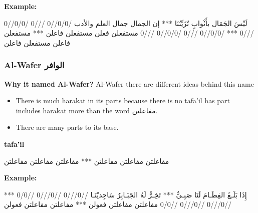 \textbf{Example:}

\begin{Arabic}
	\begin{traditionalpoem*}
          
لَيْسَ الجَمَال بأَثْوابٍ تُزَيِّنُنَا    ***	إن الجمال جمال العلم والأدب
/0/0//0 ///0 /0/0//0 ///0   ***  /0/0//0 ///0 /0/0//0 ///0
مستفعلن فعلن مستفعلن فاعلن  *** مستفعلن فاعلن مستفعلن فاعلن
	\end{traditionalpoem*}
      \end{Arabic}

\subsubsection{Al-Wafer \textarabic{الوافر}}
\textbf{Why it named Al-Wafer?}
Al-Wafer there are different ideas behind this name 
\begin{itemize}
\item There is much harakat in its parts because there is no tafa'il has part includes harakat more than the word \textarabic{مفاعلتن}.
\item There are many parts to its base.
\end{itemize}

\textbf{tafa'il}

\begin{Arabic}
	\begin{traditionalpoem*}

          مفاعلتن مفاعلتن مفاعلتن *** مفاعلتن مفاعلتن مفاعلتن 

	\end{traditionalpoem*}
      \end{Arabic}


\textbf{Example:}

\begin{Arabic}
  \begin{traditionalpoem*}
    إِذَا بَلَـغَ الفِطَـامَ لَنَا صَبِـيٌّ *** تَخِـرُّ لَهُ الجَبَـابِرُ سَاجِديْنَـا
    //0///0 //0///0 //0/0 ***  //0///0 //0///0 //0/0
    مفاعلتن مفاعلتن فعولن  *** مفاعلتن مفاعلتن فعولن

	\end{traditionalpoem*}
      \end{Arabic}
\newpage

